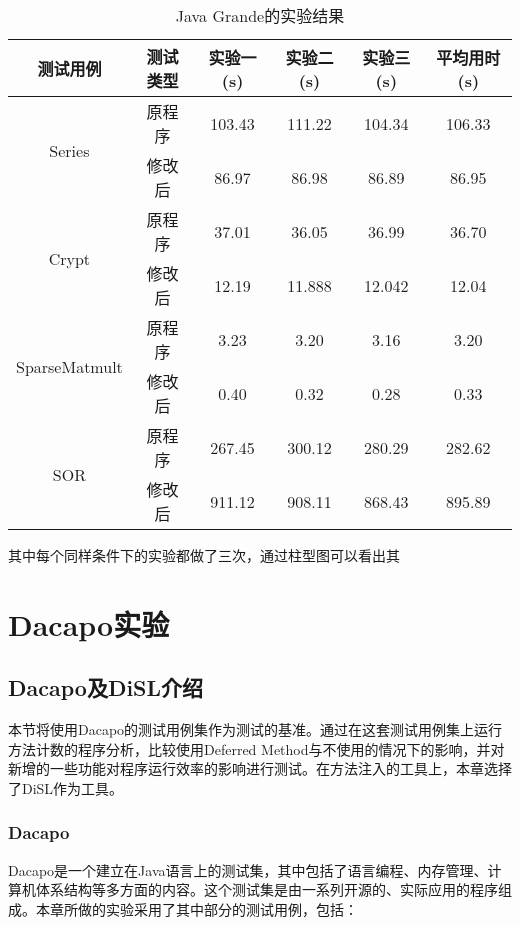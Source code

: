 \begin{table}[htbp]
	\centering
	\caption{\label{table1}Java Grande的实验结果}
	\begin{tabular}{c|c|c|c|c|c}
		\hline
		测试用例 & 测试类型 & 实验一(s) & 实验二(s) & 实验三(s) & 平均用时(s) \\
		\hline
		\multirow{2}{*}{Series} & 原程序 & 103.43 & 111.22 & 104.34 & 106.33 \\
		\cline{2-6}
		& 修改后 & 86.97 & 86.98 & 86.89 &86.95 \\
		\hline
		\multirow{2}{*}{Crypt} & 原程序 & 37.01 & 36.05 & 36.99 & 36.70 \\
		\cline{2-6}
		& 修改后 & 12.19 & 11.888 & 12.042 &12.04 \\
		\hline
		\multirow{2}{*}{SparseMatmult} & 原程序 & 3.23 & 3.20 & 3.16 & 3.20 \\
		\cline{2-6}
		& 修改后 & 0.40 & 0.32 & 0.28 & 0.33 \\
		\hline
		\multirow{2}{*}{SOR} & 原程序 & 267.45 & 300.12 & 280.29 & 282.62 \\
		\cline{2-6}
		& 修改后 & 911.12 & 908.11 & 868.43 & 895.89 \\
		\hline
	\end{tabular}
\end{table}

其中每个同样条件下的实验都做了三次，通过柱型图可以看出其

\section{Dacapo实验}

\subsection{Dacapo及DiSL介绍}

本节将使用Dacapo的测试用例集作为测试的基准。通过在这套测试用例集上运行方法计数的程序分析，比较使用Deferred Method与不使用的情况下的影响，并对新增的一些功能对程序运行效率的影响进行测试。在方法注入的工具上，本章选择了DiSL作为工具。

\subsubsection{Dacapo}

Dacapo\cite{dacapo}是一个建立在Java语言上的测试集，其中包括了语言编程、内存管理、计算机体系结构等多方面的内容。这个测试集是由一系列开源的、实际应用的程序组成。本章所做的实验采用了其中部分的测试用例，包括：

